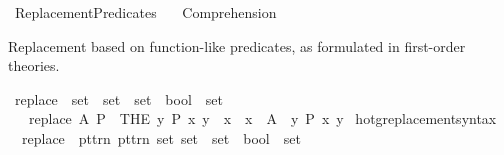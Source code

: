 %
\begin{isabellebody}%
%
%
\isadelimdocument
%
\endisadelimdocument
%
\isatagdocument
\isanewline
\isanewline
%
\isamarkuptrue%
%
\endisatagdocument
{\isafolddocument}%
%
\isadelimdocument
%
\endisadelimdocument
%
\isadelimtheory
%
\endisadelimtheory
%
\isatagtheory
{}\isamarkupfalse%
\ Replacement{\isacharunderscore}{\kern0pt}Predicates\isanewline
\ \ \ Comprehension\isanewline
{}%
\endisatagtheory
{\isafoldtheory}%
%
\isadelimtheory
%
\endisadelimtheory
%
\begin{isamarkuptext}%
Replacement based on function-like predicates, as formulated in first-order theories.%
\end{isamarkuptext}\isamarkuptrue%
\isamarkupfalse%
\ replace\ {\isacharcolon}{\kern0pt}{\isacharcolon}{\kern0pt}\ {\isacartoucheopen}set\ {\isasymRightarrow}\ {\isacharparenleft}{\kern0pt}set\ {\isasymRightarrow}\ set\ {\isasymRightarrow}\ bool{\isacharparenright}{\kern0pt}\ {\isasymRightarrow}\ set{\isacartoucheclose}\isanewline
\ \ \ {\isachardoublequoteopen}replace\ A\ P\ {\isacharequal}{\kern0pt}\ {\isacharbraceleft}{\kern0pt}THE\ y{\isachardot}{\kern0pt}\ P\ x\ y\ {\isacharbar}{\kern0pt}\ x\ {\isasymin}\ {\isacharbraceleft}{\kern0pt}x\ {\isasymin}\ A\ {\isacharbar}{\kern0pt}\ {\isasymexists}{\isacharbang}{\kern0pt}y{\isachardot}{\kern0pt}\ P\ x\ y{\isacharbraceright}{\kern0pt}{\isacharbraceright}{\kern0pt}{\isachardoublequoteclose}\isanewline
\isanewline
{}\isamarkupfalse%
\ hotg{\isacharunderscore}{\kern0pt}replacement{\isacharunderscore}{\kern0pt}syntax\isanewline
{}\isanewline
{}\isamarkupfalse%
\isanewline
\ \ {\isachardoublequoteopen}{\isacharunderscore}{\kern0pt}replace{\isachardoublequoteclose}\ {\isacharcolon}{\kern0pt}{\isacharcolon}{\kern0pt}\ {\isacartoucheopen}{\isacharbrackleft}{\kern0pt}pttrn{\isacharcomma}{\kern0pt}\ pttrn{\isacharcomma}{\kern0pt}\ set{\isacharcomma}{\kern0pt}\ set\ {\isasymRightarrow}\ set\ {\isasymRightarrow}\ bool{\isacharbrackright}{\kern0pt}\ {\isacharequal}{\kern0pt}{\isachargreater}{\kern0pt}\ set{\isacartoucheclose}\ {\isacharparenleft}{\kern0pt}{\isachardoublequoteopen}{\isacharbraceleft}{\kern0pt}{\isacharunderscore}{\kern0pt}\ {\isacharbar}{\kern0pt}{\isacharslash}{\kern0pt}\ {\isacharunderscore}{\kern0pt}\ {\isasymin}\ {\isacharunderscore}{\kern0pt}{\isacharcomma}{\kern0pt}\ {\isacharunderscore}{\kern0pt}{\isacharbraceright}{\kern0pt}{\isachardoublequoteclose}{\isacharparenright}{\kern0pt}\isanewline

\end{isabellebody}
